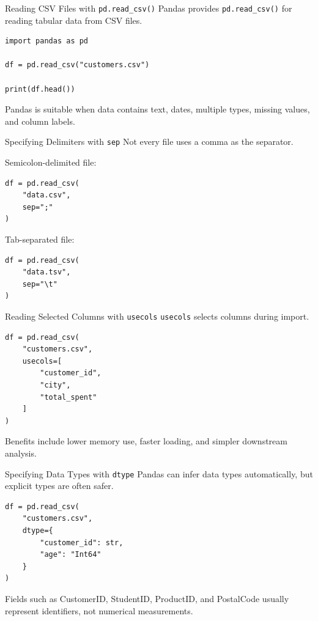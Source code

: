 \documentclass[aspectratio=169,11pt]{beamer}
\newcommand{\code}[1]{\texttt{#1}}
\begin{document}
\begin{frame}[fragile]{Reading CSV Files with \code{pd.read\_csv()}}
Pandas provides \code{pd.read\_csv()} for reading tabular data from CSV files.

\begin{lstlisting}[style=pythonstyle]
import pandas as pd

df = pd.read_csv("customers.csv")

print(df.head())
\end{lstlisting}

Pandas is suitable when data contains text, dates, multiple types, missing values, and column labels.
\end{frame}

\begin{frame}[fragile]{Specifying Delimiters with \code{sep}}
Not every file uses a comma as the separator.

Semicolon-delimited file:
\begin{lstlisting}[style=pythonstyle]
df = pd.read_csv(
    "data.csv",
    sep=";"
)
\end{lstlisting}

Tab-separated file:
\begin{lstlisting}[style=pythonstyle]
df = pd.read_csv(
    "data.tsv",
    sep="\t"
)
\end{lstlisting}
\end{frame}

\begin{frame}[fragile]{Reading Selected Columns with \code{usecols}}
\code{usecols} selects columns during import.

\begin{lstlisting}[style=pythonstyle]
df = pd.read_csv(
    "customers.csv",
    usecols=[
        "customer_id",
        "city",
        "total_spent"
    ]
)
\end{lstlisting}

Benefits include lower memory use, faster loading, and simpler downstream analysis.
\end{frame}

\begin{frame}[fragile]{Specifying Data Types with \code{dtype}}
Pandas can infer data types automatically, but explicit types are often safer.

\begin{lstlisting}[style=pythonstyle]
df = pd.read_csv(
    "customers.csv",
    dtype={
        "customer_id": str,
        "age": "Int64"
    }
)
\end{lstlisting}

Fields such as CustomerID, StudentID, ProductID, and PostalCode usually represent identifiers, not numerical measurements.
\end{frame}
\end{document}
